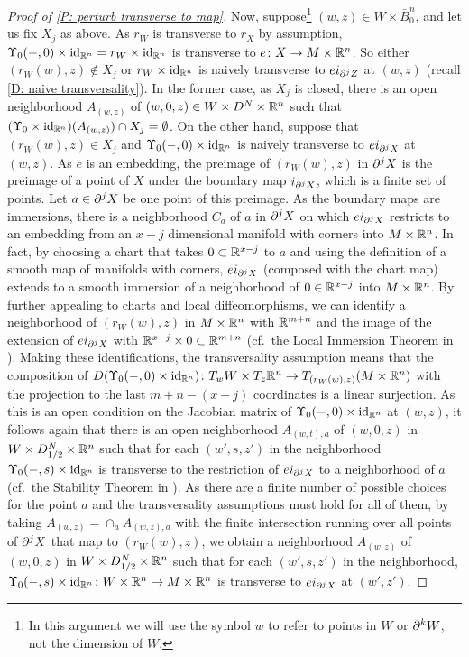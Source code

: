 \begin{proof}[Proof of \cref{P: perturb transverse to map}]
	Now, suppose\footnote{In this argument we will use the symbol $w$ to refer to points in $W$ or $\partial^k W$, not the dimension of $W$.} $(w,z) \in W \times \bar B^n_0$, and let us fix $X_j$ as above.
	As $r_W$ is transverse to $r_X$ by assumption, $\Upsilon_0(-,0) \times \mathrm{id}_{\mathbb{R}^n} = r_W \times \mathrm{id}_{\mathbb{R}^n}$ is transverse to $e \colon X \to M \times \mathbb{R}^n$.
	So either $(r_W(w),z)\notin X_j$ or $r_W \times \mathrm{id}_{\mathbb{R}^n}$ is naively transverse to $ei_{\partial^jZ}$ at $(w,z)$ (recall \cref{D: naive transversality}).
	In the former case, as $X_j$ is closed, there is an open neighborhood $A_{(w,z)}$ of $(w,0,z) \in W \times D^N \times \mathbb{R}^n$ such that $(\Upsilon_0 \times \mathrm{id}_{\mathbb{R}^n})(A_{(w,z)}) \cap X_j = \emptyset$.
	On the other hand, suppose that $(r_W(w),z) \in X_j$ and $\Upsilon_0(-,0) \times \mathrm{id}_{\mathbb{R}^n}$ is naively transverse to $ei_{\partial^jX}$ at $(w,z)$.
	As $e$ is an embedding, the preimage of $(r_W(w),z)$ in $\partial^jX$ is the preimage of a point of $X$ under the boundary map $i_{\partial^jX}$, which is a finite set of points.
	Let $a \in \partial^jX$ be one point of this preimage.
	As the boundary maps are immersions, there is a neighborhood $C_a$ of $a$ in $\partial^jX$ on which $ei_{\partial^jX}$ restricts to an embedding from an $x-j$ dimensional manifold with corners into $M \times \mathbb{R}^n$.
	In fact, by choosing a chart that takes $0 \subset \mathbb{R}^{x-j}$ to $a$ and using the definition of a smooth map of manifolds with corners, $ei_{\partial^jX}$ (composed with the chart map) extends to a smooth immersion of a neighborhood of $0 \in \mathbb{R}^{x-j}$ into $M \times \mathbb{R}^n$.
	By further appealing to charts and local diffeomorphisms, we can identify a neighborhood of $(r_W(w),z)$ in $M \times \mathbb{R}^n$ with $\mathbb{R}^{m+n}$ and the image of the extension of $ei_{\partial^jX}$ with $\mathbb{R}^{x-j} \times 0 \subset \mathbb{R}^{m+n}$ (cf.\ the Local Immersion Theorem in \cite{GuPo74}).
	Making these identifications, the transversality assumption means that the composition of $D(\Upsilon_0(-,0) \times \mathrm{id}_{\mathbb{R}^n}) \colon T_wW \times T_z\mathbb{R}^n
	\to T_{(r_W(w),z)}(M \times \mathbb{R}^n)$ with the projection to the last $m+n-(x-j)$ coordinates is a linear surjection.
	As this is an open condition on the Jacobian matrix of $\Upsilon_0(-,0) \times \mathrm{id}_{\mathbb{R}^n}$ at $(w,z)$, it follows again that there is an open neighborhood $A_{(w,t),a}$ of $(w,0,z)$ in $W \times D_{1/2}^N \times \mathbb{R}^n$ such that for each $(w',s,z')$ in the neighborhood $\Upsilon_0(-,s) \times \mathrm{id}_{\mathbb{R}^n}$ is transverse to the restriction of $ei_{\partial^jX}$ to a neighborhood of $a$ (cf.\ the Stability Theorem in \cite{GuPo74}).
	As there are a finite number of possible choices for the point $a$ and the transversality assumptions must hold for all of them, by taking $A_{(w,z)} = \cap_a A_{(w,z),a}$ with the finite intersection running over all points of $\partial^jX$ that map to $(r_W(w),z)$, we obtain a neighborhood $A_{(w,z)}$ of $(w,0,z)$ in $W \times D_{1/2}^N \times \mathbb{R}^n$ such that for each $(w',s,z')$ in the neighborhood, $\Upsilon_0(-,s) \times \mathrm{id}_{\mathbb{R}^n} \colon W \times \mathbb{R}^n \to M \times \mathbb{R}^n$ is transverse to $ei_{\partial^jX}$ at $(w',z')$.


\end{proof}
